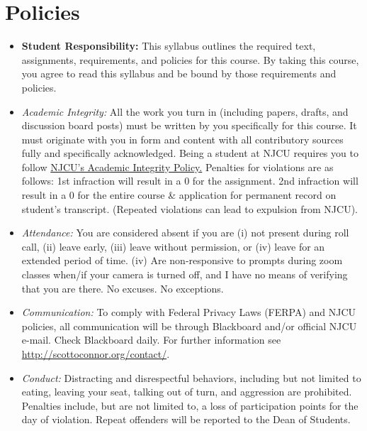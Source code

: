 \documentclass[article,oneside]{memoir}
\begin{document}
\section{Policies}

\begin{itemize}

\item \textbf{Student Responsibility:} This syllabus outlines the required text, assignments, requirements, and policies for this course. By taking this course, you agree to read this syllabus and be bound by those requirements and policies. 

 \item \textit{Academic Integrity:} All the work you turn in (including papers, drafts, and discussion board posts) must be written by you specifically for this course. It must originate with you in form and content with all contributory sources fully and specifically acknowledged. Being a student at NJCU requires you to follow \href{http://scottoconnor.org/resources/Plagiarism.pdf}{NJCU's Academic Integrity Policy.} Penalties for violations are as follows: 1st infraction will result in a 0 for the assignment.  2nd infraction will result in a 0 for the entire course \& application for permanent record on student's transcript. (Repeated violations can lead to expulsion from NJCU). 

\item \textit{Attendance:} You are considered absent if you are (i) not present during roll call, (ii) leave early, (iii) leave without permission, or (iv) leave for an extended period of time. (iv) Are non-responsive to prompts during zoom classes when/if your camera is turned off, and I have no means of verifying that you are there. No excuses. No exceptions.



\item \textit{Communication:} To comply with Federal Privacy Laws (FERPA) and NJCU policies, all communication will be through Blackboard and/or official NJCU e-mail. Check Blackboard daily. For further information see \href{http://scottoconnor.org/contact/}{http://scottoconnor.org/contact/}.

\item \textit{Conduct:} Distracting and disrespectful behaviors, including but not limited to eating, leaving your seat, talking out of turn, and aggression are prohibited. Penalties include, but are not limited to, a loss of participation points for the day of violation. Repeat offenders will be reported to the Dean of Students. 


\end{itemize}
\end{document}
